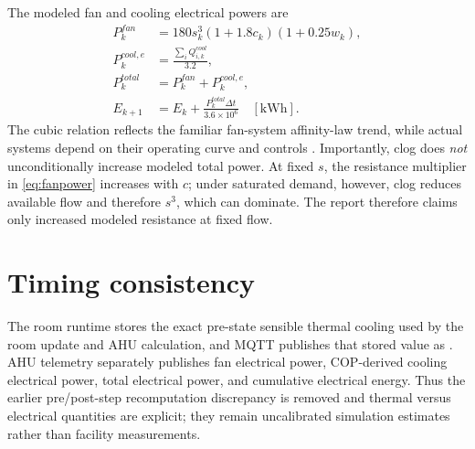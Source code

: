The modeled fan and cooling electrical powers are
\begin{align}
P^{fan}_k&=180s_k^3(1+1.8c_k)(1+0.25w_k),\label{eq:fanpower}\\
P^{cool,e}_k&=\frac{\sum_iQ^{cool}_{i,k}}{3.2},\\
P^{total}_k&=P^{fan}_k+P^{cool,e}_k,\\
E_{k+1}&=E_k+\frac{P^{total}_k\Delta t}{3.6\times10^6}\quad[\si{\kilo\watt\hour}].
\end{align}
The cubic relation reflects the familiar fan-system affinity-law trend, while actual systems depend on their operating curve and controls \citep{doefan2003}. Importantly, clog does \emph{not} unconditionally increase modeled total power. At fixed $s$, the resistance multiplier in \cref{eq:fanpower} increases with $c$; under saturated demand, however, clog reduces available flow and therefore $s^3$, which can dominate. The report therefore claims only increased modeled resistance at fixed flow.

\section{Timing consistency}
The room runtime stores the exact pre-state sensible thermal cooling used by the room update and AHU calculation, and MQTT publishes that stored value as . AHU telemetry separately publishes fan electrical power, COP-derived cooling electrical power, total electrical power, and cumulative electrical energy. Thus the earlier pre/post-step recomputation discrepancy is removed and thermal versus electrical quantities are explicit; they remain uncalibrated simulation estimates rather than facility measurements.
